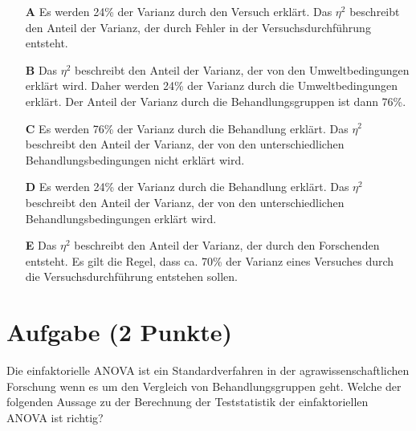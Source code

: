 \documentclass[a4paper, 9pt]{scrartcl}\usepackage[]{graphicx}\usepackage[]{xcolor}
\begin{document}
\begin{enumerate}
\item [\textbf{A} \msquare] Es werden 24\% der Varianz durch den Versuch erklärt. Das $\eta^2$ beschreibt den Anteil der Varianz, der durch Fehler in der Versuchsdurchführung entsteht.
\item [\textbf{B} \msquare] Das $\eta^2$ beschreibt den Anteil der Varianz, der von den Umweltbedingungen erklärt wird. Daher werden 24\% der Varianz durch die Umweltbedingungen erklärt. Der Anteil der Varianz durch die Behandlungsgruppen ist dann 76\%.
\item [\textbf{C} \msquare] Es werden 76\% der Varianz durch die Behandlung erklärt. Das $\eta^2$ beschreibt den Anteil der Varianz, der von den unterschiedlichen Behandlungsbedingungen nicht erklärt wird.
\item [\textbf{D} \msquare] Es werden 24\% der Varianz durch die Behandlung erklärt. Das $\eta^2$ beschreibt den Anteil der Varianz, der von den unterschiedlichen Behandlungsbedingungen erklärt wird.
\item [\textbf{E} \msquare] Das $\eta^2$ beschreibt den Anteil der Varianz, der durch den Forschenden entsteht. Es gilt die Regel, dass ca. 70\% der Varianz eines Versuches durch die Versuchsdurchführung entstehen sollen.
\end{enumerate} 

\section{Aufgabe \hfill (2 Punkte)}



Die einfaktorielle ANOVA ist ein Standardverfahren in der agrawissenschaftlichen Forschung wenn es um den Vergleich von Behandlungsgruppen geht. Welche der folgenden Aussage zu der Berechnung der Teststatistik der einfaktoriellen ANOVA ist richtig?
\end{document}

